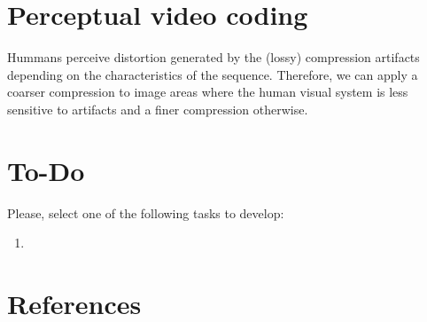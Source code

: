 \section{Perceptual video coding}
Hummans perceive distortion generated by the (lossy) compression
artifacts depending on the characteristics of the sequence. Therefore,
we can apply a coarser compression to image areas where the human
visual system is less sensitive to artifacts and a finer compression
otherwise.

\section{To-Do}
Please, select one of the following tasks to develop:
\begin{enumerate}
\item
\end{enumerate}

\section{References}

\renewcommand{\addcontentsline}[3]{}%

